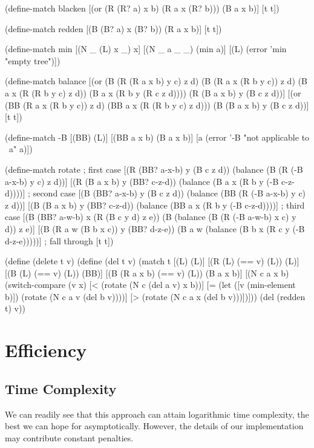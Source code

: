 \documentclass[preprint]{sigplanconf}
\begin{document}
\begin{schemedisplay}
(define-match blacken
  [(or (R (R? a) x b)
       (R a x (R? b)))
   (B a x b)]
  [t t])

(define-match redden
  [(B (B? a) x (B? b))
   (R a x b)]
  [t t])

(define-match min
  [(N _ (L) x _) x]
  [(N _ a _ _) (min a)]
  [(L) (error 'min "empty tree")])

(define-match balance
  [(or (B (R (R a x b) y c) z d)
       (B (R a x (R b y c)) z d)
       (B a x (R (R b y c) z d))
       (B a x (R b y (R c z d))))
   (R (B a x b) y (B c z d))]
  [(or (BB (R a x (R b y c)) z d)
       (BB a x (R (R b y c) z d)))
   (B (B a x b) y (B c z d))]
  [t t])

(define-match -B
  [(BB) (L)]
  [(BB a x b) (B a x b)]
  [a (error '-B "not applicable to ~a" a)])

(define-match rotate
  ; first case
  [(R (BB? a-x-b) y (B c z d))
   (balance (B (R (-B a-x-b) y c) z d))]
  [(R (B a x b) y (BB? c-z-d))
   (balance (B a x (R b y (-B c-z-d))))]
  ; second case
  [(B (BB? a-x-b) y (B c z d))
   (balance (BB (R (-B a-x-b) y c) z d))]
  [(B (B a x b) y (BB? c-z-d))
   (balance (BB a x (R b y (-B c-z-d))))]
  ; third case
  [(B (BB? a-w-b) x (R (B c y d) z e))
   (B (balance (B (R (-B a-w-b) x c) y d)) z e)]
  [(B (R a w (B b x c)) y (BB? d-z-e))
   (B a w (balance (B b x (R c y (-B d-z-e)))))]
  ; fall through
  [t t])

(define (delete t v)
  (define (del t v)
    (match t
      [(L) (L)]
      [(R (L) (== v) (L))
       (L)]
      [(B (L) (== v) (L))
       (BB)]
      [(B (R a x b) (== v) (L))
       (B a x b)]
      [(N c a x b)
       (switch-compare
        (v x)
        [< (rotate (N c (del a v) x b))]
        [= (let ([v (min-element b)])
             (rotate (N c a v (del b v))))]
        [> (rotate (N c a x (del b v)))])]))
  (del (redden t) v))
\end{schemedisplay}

\section{Efficiency}

\subsection{Time Complexity}

We can readily see that this approach can attain logarithmic time complexity, the best we can hope for asymptotically. However, the details of our implementation may contribute constant penalties.
\end{document}
